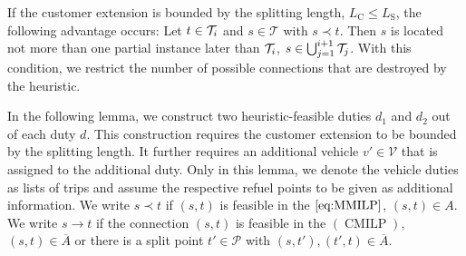 If the customer extension is bounded by the splitting length, \ie ${L_{\operatorname{C}}\leq L_{\operatorname{S}}}$, the following advantage occurs: Let ${t\in\mathcal{T}_i}$ and ${s\in\mathcal{T}}$ with ${s\prec t}$. Then $s$ is located not more than one partial instance later than $\mathcal{T}_i$, \ie ${s\in\bigcup_{j=1}^{i+1}\mathcal{T}_j}$. With this condition, we restrict the number of possible connections that are destroyed by the heuristic.

In the following lemma, we construct two heuristic-feasible duties $d_1$ and $d_2$ out of each duty $d$. This construction requires the customer extension to be bounded by the splitting length. It further requires an additional vehicle ${v'\in\mathcal{V}}$ that is assigned to the additional duty. Only in this lemma, we denote the vehicle duties as lists of trips and assume the respective refuel points to be given as additional information. We write ${s\prec t}$ if $(s,t)$ is feasible in the $\eqref{eq:MMILP}$, \ie ${(s,t)\in A}$.  We write ${s\to t}$ if the connection $(s,t)$ is feasible in the $(\operatorname{CMILP})$, \ie ${(s,t)\in\overline{A}}$ or there is a split point ${t'\in\mathcal{P}}$ with ${(s,t'),(t',t)\in\overline{A}}$.

